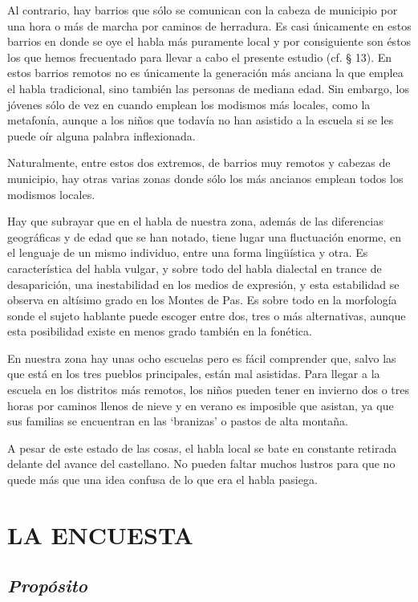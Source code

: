 \documentclass[11pt,spanish,b5paper]{book}
\begin{document}
Al contrario, hay barrios que sólo se comunican con la cabeza de municipio por una hora o más de marcha por caminos de herradura. Es casi únicamente en estos barrios en donde se oye el habla más puramente local y por consiguiente son éstos los que hemos frecuentado para llevar a cabo el presente estudio (cf. § 13). En estos barrios remotos no es únicamente la generación más anciana
la que emplea el habla tradicional, sino también las personas de mediana edad. Sin embargo, los jóvenes sólo de vez en cuando emplean los modismos más locales, como la metafonía, aunque a los niños que todavía no han asistido a la escuela si se les puede oír alguna palabra inflexionada.

Naturalmente, entre estos dos extremos, de barrios muy remotos y cabezas de municipio, hay otras varias zonas donde sólo los más ancianos emplean todos los modismos locales. 

Hay que subrayar que en el habla de nuestra zona, además de las diferencias geográficas y de edad que se han notado, tiene lugar una fluctuación enorme, en el lenguaje de un mismo individuo, entre una forma lingüística y otra. Es característica del habla vulgar, y sobre todo del habla dialectal en trance de desaparición, una inestabilidad en los medios de expresión, y esta estabilidad se observa en altísimo grado en los Montes de Pas. Es sobre todo en la morfología sonde el sujeto hablante puede escoger entre dos, tres o más alternativas, aunque esta posibilidad existe en menos grado también en la fonética.

En nuestra zona hay unas ocho escuelas pero es fácil comprender que, salvo las que está en los tres pueblos principales, están mal asistidas. Para llegar a la escuela en los distritos más remotos, los niños pueden tener en invierno dos o tres horas por caminos llenos de nieve y en verano es imposible que asistan, ya que sus familias se encuentran en las `branizas' o pastos de alta montaña. 

A pesar de este estado de las cosas, el habla local se bate en constante retirada delante del avance del castellano. No pueden faltar muchos lustros para que no quede más que una idea confusa de lo que era el habla pasiega. 



\chapter{LA ENCUESTA}
\section{\emph{Propósito}}
\end{document}
